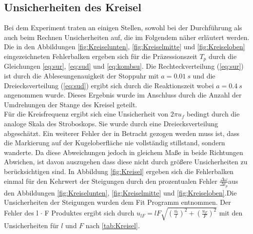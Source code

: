 \subsection{Unsicherheiten des Kreisel}
Bei dem Experiment traten an einigen Stellen, sowohl bei der Durchführung als auch beim Rechnen Unsicherheiten auf, die im Folgendem näher erläutert werden.
Die in den Abbildungen \ref{fig:Kreiselunten}, \ref{fig:Kreiselmitte} und \ref{fig:Kreiseloben} eingezeichneten Fehlerbalken ergeben sich für die Präzessionszeit $T_p$ durch die Gleichungen \ref{eq:sur}, \ref{eq:sud} und \ref{eq:kombsu}.
Die Rechteckverteilung (\ref{eq:sur}) ist durch die Ableseungenauigkeit der Stoppuhr mit $a=\SI{0.01}{s}$ und die Dreiecksverteilung (\ref{eq:sud}) ergibt sich durch die Reaktionszeit wobei $a=\SI{0,4}{s}$ angenommen wurde. Dieses Ergebnis wurde im Anschluss durch die Anzahl der Umdrehungen der Stange des Kreisel geteilt.\\

Für die Kreisfrequenz ergibt sich eine Unsicherheit von $2 \pi u_f$ bedingt durch die analoge Skala des Stroboskops. Sie wurde durch eine Dreiecksverteilung abgeschätzt. %
Ein weiterer Fehler der in Betracht gezogen werden muss ist, dass die Markierung auf der Kugeloberfläche nie vollständig stillstand, sondern wanderte. Da diese Abweichungen jedoch in gleichem Maße in beide Richtungen Abwichen, ist davon auszugehen dass diese nicht durch größere Unsicherheiten zu berücksichtigen sind.
In Abbildung \ref{fig:Kreisel} ergeben sich die Fehlerbalken einmal für den Kehrwert der Steigungen durch den prozentualen Fehler $\frac{\Delta \omega}{\Delta t_p} $aus den Abbildungen \ref{fig:Kreiselunten}, \ref{fig:Kreiselmitte} und \ref{fig:Kreiseloben}.Die Unsicherheiten der Steigungen wurden dem Fit Programm entnommen. 
Der Fehler des  l $\cdot$ F Produktes ergibt sich durch $u_{lF}=lF\sqrt{\left(\frac{u_l}{	l}\right)^2+\left(\frac{u_F}{F}\right)^2}$ mit den Unsicherheiten für $l$ und $F$ nach \cref{tab:Kreisel}.\\

